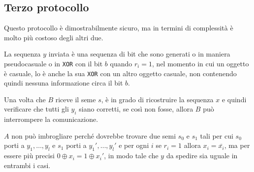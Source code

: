 \subsection{Terzo protocollo}
Questo protocollo è dimostrabilmente sicuro, ma in termini di complessità è molto più
costoso degli altri due.
  
La sequenza $y$ inviata è una sequenza di bit che sono generati o in maniera pseudocasuale 
o in \texttt{XOR} con il bit $b$ quando $r_i = 1$, nel momento in cui un oggetto è casuale,
lo è anche la sua \texttt{XOR} con un altro oggetto casuale, non contenendo quindi nessuna 
informazione circa il bit $b$.

Una volta che $B$ riceve il seme $s$, è in grado di ricostruire la sequenza $x$ e quindi
verificare che tutti gli $y_i$ siano corretti, se così non fosse, allora $B$ può
interrompere la comunicazione.

$A$ non può imbrogliare perché dovrebbe trovare due semi $s_0$ e $s_1$ tali
per cui $s_0$ porti a $y_1,\dots,y_l$ e $s_1$ porti a
$y_1',\dots,y_l'$ e per ogni $i$ se $r_i = 1$ allora $x_i = \bar{x_i}$, ma per essere più precisi 
$0 \oplus x_i = 1 \oplus x_i'$, in modo tale che $y$ da spedire sia uguale in entrambi i casi.

